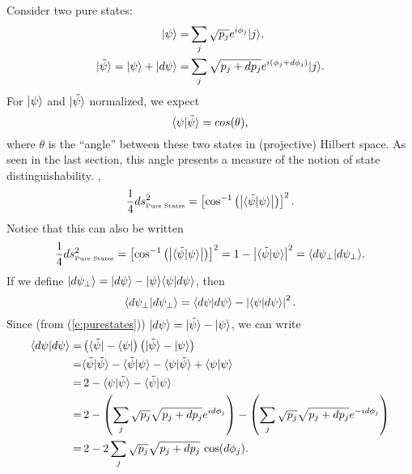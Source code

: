 Consider two pure states:
\begin{equation}
\begin{split}
    {|{\psi}\rangle} =& \sum_j \sqrt{p_j}e^{i\phi_j}{|{j}\rangle},\\
    {|{\tilde\psi}\rangle} = {|{\psi}\rangle} + {|{d\psi}\rangle} =& 
              \sum_j \sqrt{p_j + dp_j}e^{i(\phi_j + d\phi_j)}{|{j}\rangle}.
\end{split}
\label{e:purestates}
\end{equation}
For ${|{\psi}\rangle}$ and ${|{\tilde\psi}\rangle}$ normalized, we expect
\begin{equation}
{\langle{\psi}|{\tilde\psi}\rangle} = cos(\theta),
\end{equation}
where $\theta$ is the ``angle'' between these two states in 
(projective) Hilbert space.  As seen in the last section, 
this angle presents a measure of the
notion of state distinguishability.  \ie,
\begin{equation}
\frac{1}{4}ds_{\text{\tiny Pure States}}^2 = 
    \left[ \cos^{-1}\left(\left|
                        {\langle{\tilde\psi}|{\psi}\rangle}
                    \right|\right)
    \right]^2.
\end{equation}
Notice that this can also be written
\begin{equation}
\frac{1}{4}ds_{\text{\tiny Pure States}}^2 = 
    \left[ \cos^{-1}\left(\left|
                        {\langle{\tilde\psi}|{\psi}\rangle}
                    \right|\right)
    \right]^2
= 1-\left| {\langle{\tilde\psi}|{\psi}\rangle} \right|^2    
= {\langle{d\psi_\perp}|{d\psi_\perp}\rangle}.
\end{equation}
If we define ${|{d\psi_\perp}\rangle} = {|{d\psi}\rangle} - {|{\psi}\rangle}{\langle{\psi}|{d\psi}\rangle}$, 
then
\begin{equation}
    {\langle{d\psi_\perp}|{d\psi_\perp}\rangle} = 
        {\langle{d\psi}|{d\psi}\rangle} - \left| {\langle{\psi}|{d\psi}\rangle} \right|^2.
\label{e:dPsi_perp}
\end{equation}
Since (from (\ref{e:purestates})) 
${|{d\psi}\rangle} = {|{\tilde\psi}\rangle} - {|{\psi}\rangle}$, we can write
\begin{equation}
\begin{split}
    {\langle{d\psi}|{d\psi}\rangle} 
        =& \left({\langle{\tilde\psi}|}-{\langle{\psi}|}\right)
           \left({|{\tilde\psi}\rangle}-{|{\psi}\rangle}\right)\\
        =& {\langle{\tilde\psi}|{\tilde\psi}\rangle} - {\langle{\tilde\psi}|{\psi}\rangle}
          - {\langle{\psi}|{\tilde\psi}\rangle} + {\langle{\psi}|{\psi}\rangle}\\
        =& \,2 - {\langle{\psi}|{\tilde\psi}\rangle} - {\langle{\tilde\psi}|{\psi}\rangle}\\
        =& \,2 - \left(
                      \sum_j\sqrt{p_j}\sqrt{p_j+dp_j}e^{id\phi_j}
                \right) 
                - \left(
                      \sum_j\sqrt{p_j}\sqrt{p_j+dp_j}e^{-id\phi_j}
                \right)\\
        =& \,2 - 2 \sum_j\sqrt{p_j}\sqrt{p_j+dp_j}
                \,\cos(d\phi_j).
\end{split}
\end{equation}
